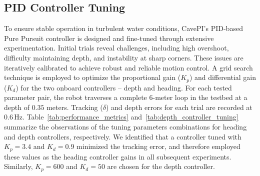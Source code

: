 \subsection{PID Controller Tuning}
\vspace{-1 mm}
To ensure stable operation in turbulent water conditions, CavePI’s PID-based Pure Pursuit controller is designed and fine-tuned through extensive experimentation. Initial trials reveal challenges, including high overshoot, difficulty maintaining depth, and instability at sharp corners. These issues are iteratively calibrated to achieve robust and reliable motion control. A grid search technique is employed to optimize the proportional gain ($K_p$) and differential gain ($K_d$) for the two onboard controllers -- depth and heading. For each tested parameter pair, the robot traverses a complete 6-meter loop in the testbed at a depth of $0.35$ meters. Tracking ($\delta$) and depth errors for each trial are recorded at $0.6$\,Hz. Table~\ref{tab:performance_metrics} and~\ref{tab:depth_controller_tuning} summarize the observations of the tuning parameters combinations for heading and depth controllers, respectively. We identified that a controller tuned with $K_p = 3.4$ and $K_d = 0.9$ minimized the tracking error, and therefore employed these values as the heading controller gains in all subsequent experiments. Similarly, $K_p = 600$ and $K_d = 50$ are chosen for the depth controller.

\setlength{\extrarowheight}{2pt}
\begin{table}[h]
\centering
\caption{Tracking errors from the line following experiments are compared for various choices of $K_p$ and $K_d$ values of the \textit{heading} controller. Here, $\delta$: mean tracking error (cm), $\sigma$: standard deviation.}%
\vspace{-1mm}
\label{tab:performance_metrics}
\vspace{-2mm}
\end{table}


